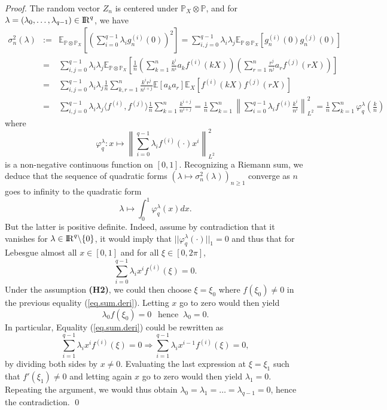 \documentclass{svproc}
\newcommand{\Prob}{\mathbb{P}}
\newcommand \Esp {\mathbb{E}}
\def\R{{\rm I\kern-0.16em R}}
\begin{document}
\begin{proof}
The random vector $Z_n$ is centered under $\Prob_X\otimes \Prob$, and for $\lambda=(\lambda_0,\dots, \lambda_{q-1})\in \R^{q}$, we have 
\begin{eqnarray*}
\sigma_n^2(\lambda) & :=&  \Esp_{\Prob\otimes \Prob_X}\left[ \left(\sum_{i=0}^{q-1}\lambda_i g_n^{(i)}(0) \right)^2\right]= \sum_{i,j=0}^{q-1}\lambda_i \lambda_j \Esp_{\Prob \otimes \Prob_X}\left[g_n^{(i)}(0)g_n^{(j)}(0)\right]\\
&=&\sum_{i,j=0}^{q-1}\lambda_i \lambda_j \Esp_{\Prob \otimes \Prob_X}\left[\frac{1}{n}\left(\sum_{k=1}^{n}\frac{k^{i}}{n^{i}}a_kf^{(i)}(kX)\right) \left(\sum_{r=1}^{n}\frac{r^{j}}{n^{j}}a_rf^{(j)}(rX)\right)\right]\\
&=&\sum_{i,j=0}^{q-1}\lambda_i \lambda_j \frac{1}{n}\sum_{k,r=1}^{n}\frac{k^{i} r^{j}}{n^{i+j}}\Esp[a_ka_r] \Esp_{X}\left[f^{(i)}(kX)f^{(j)}(rX)\right]\\
&=&\sum_{i,j=0}^{q-1}\lambda_i \lambda_j \langle f^{(i)},f^{(j)}\rangle
\frac{1}{n}\sum_{k=1}^{n}\frac{k^{i+j}}{n^{i+j}} =\frac{1}{n}\sum_{k=1}^{n}\left\|\sum_{i=0}^{q-1}\lambda_if^{(i)}\frac{k^{i}}{n^{i}}\right\|^2_{L^2}=\frac{1}{n}\sum_{k=1}^{n}\varphi_q^{\lambda}\left(\frac{k}{n}\right)\end{eqnarray*}
where 
\[
\varphi_q^{\lambda}: x \mapsto \left\|\sum_{i=0}^{q-1}\lambda_i f^{(i)}(\cdot) x^{i}\right\|_{L^2}^{2}
\] 
is a non-negative continuous function on $[0,1]$. Recognizing a Riemann sum, we deduce that the sequence of quadratic forms $(\lambda \mapsto \sigma_n^2(\lambda))_{n\geq 1}$ converge as $n$ goes to infinity to the quadratic form 
\[
\lambda \mapsto \int_0^{1}\varphi_q^{\lambda}(x)dx.
\]
But the latter is positive definite. Indeed, assume by contradiction that it vanishes for $\lambda \in \R^q \backslash \{0\}$, it would imply that $||\varphi_q^{\lambda}(\cdot)||_1=0$ and thus that for Lebesgue almost all $x\in [0,1]$ and for all $\xi \in [0,2\pi]$, 
\begin{equation} \label{eq.sum.deri}
\sum_{i=0}^{q-1}\lambda_i x^{i}f^{(i)}(\xi) = 0.
\end{equation}
Under the assumption \textbf{(H2)}, we could then choose $\xi=\xi_0$ where $f(\xi_0)\neq 0$ in the previous equality (\ref{eq.sum.deri}). Letting $x$ go to zero would then yield
$$\lambda_0 f(\xi_0)=0~~\text{ hence }~\lambda_0=0.$$
In particular, Equality (\ref{eq.sum.deri}) could be rewritten as 
$$\sum_{i=1}^{q-1}\lambda_ix^{i}f^{(i)}(\xi)=0 \Longrightarrow \sum_{i=1}^{q-1}\lambda_i x^{i-1}f^{(i)}(\xi)=0,$$
by dividing both sides by $x \neq 0$. Evaluating the last expression at $\xi=\xi_1$ such that $f'(\xi_1)\neq 0$ and letting again $x$ go to zero would then yield $\lambda_1=0$. Repeating the argument, we would thus obtain $\lambda_0=\lambda_1=\dots=\lambda_{q-1}=0$, hence the contradiction.
\qed 
\end{proof}
\end{document}
